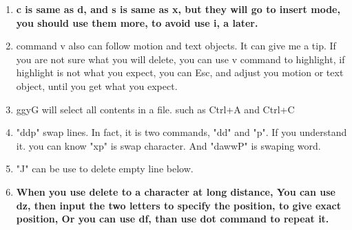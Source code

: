 \documentclass[a4paper,11pt,twoside]{book}
\begin{document}
\begin{itemize}
\begin{enumerate}
				\item \textbf{c is same as d, and s is same as x, but they will go to insert mode, you should use them more, to avoid use i, a later.}  
				
				\item command v also can follow motion and text objects. It can give me a tip. If you are not sure what you will delete, you can use v command to highlight, if highlight is not what you expect, you can Esc, and adjust you motion or text object, until you get what you expect. 

				\item ggyG will select all contents in a file. such as Ctrl+A and Ctrl+C 

			\item "ddp" swap lines. In fact, it is two commands, "dd" and "p". If you understand it. you can know "xp" is swap character. And "dawwP" is swaping word.

			\item "J" can be use to delete empty line below.

			\item \textbf{When you use delete to a character at long distance, You can use dz, then input the two letters to specify the position, to give exact position, Or you can use df, than use dot command to repeat it. }
	\end{enumerate}
\end{itemize}
\end{document}
